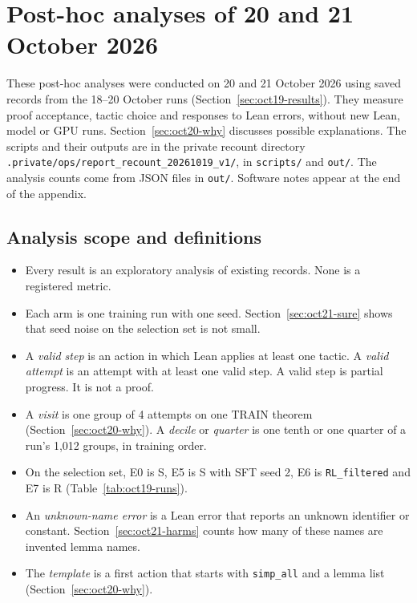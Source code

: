 \documentclass[11pt]{article}
\newcommand{\code}[1]{\texttt{#1}}
\newcommand{\pth}[1]{\nolinkurl{#1}}
\begin{document}
\clearpage
\appendix
\section{Post-hoc analyses of 20 and 21 October 2026}
\label{sec:oct21-analyses}

These post-hoc analyses were conducted on 20 and 21 October 2026 using saved records from the 18--20 October runs (Section~\ref{sec:oct19-results}).
They measure proof acceptance, tactic choice and responses to Lean errors, without new Lean, model or GPU runs.
Section~\ref{sec:oct20-why} discusses possible explanations.
The scripts and their outputs are in the private recount directory \pth{.private/ops/report_recount_20261019_v1/}, in \pth{scripts/} and \pth{out/}.
The analysis counts come from JSON files in \pth{out/}. Software notes appear at the end of the appendix.

\subsection{Analysis scope and definitions}
\label{sec:oct21-read}

\begin{itemize}
\item Every result is an exploratory analysis of existing records. None is a registered metric.
\item Each arm is one training run with one seed. Section~\ref{sec:oct21-sure} shows that seed noise on the selection set is not small.
\item A \emph{valid step} is an action in which Lean applies at least one tactic. A \emph{valid attempt} is an attempt with at least one valid step. A valid step is partial progress. It is not a proof.
\item A \emph{visit} is one group of 4 attempts on one TRAIN theorem (Section~\ref{sec:oct20-why}). A \emph{decile} or \emph{quarter} is one tenth or one quarter of a run's 1,012 groups, in training order.
\item On the selection set, E0 is S, E5 is S with SFT seed 2, E6 is \code{RL\_filtered} and E7 is R (Table~\ref{tab:oct19-runs}).
\item An \emph{unknown-name error} is a Lean error that reports an unknown identifier or constant. Section~\ref{sec:oct21-harms} counts how many of these names are invented lemma names.
\item The \emph{template} is a first action that starts with \code{simp\_all} and a lemma list (Section~\ref{sec:oct20-why}).
\end{itemize}
\end{document}
